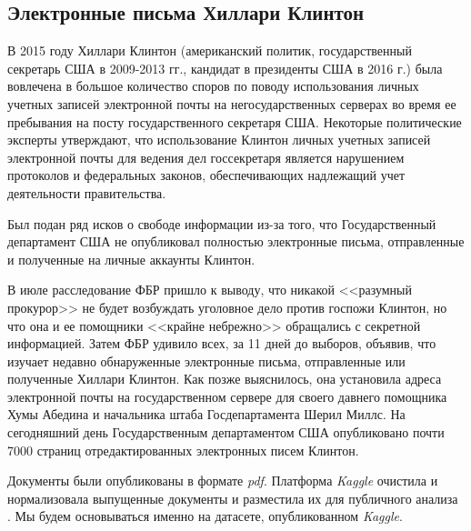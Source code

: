 \subsection{Электронные письма Хиллари Клинтон}

В 2015 году Хиллари Клинтон (американский политик, государственный секретарь США в 2009-2013 гг., кандидат в президенты США в 2016 г.) была вовлечена в большое количество споров по поводу использования личных учетных записей электронной почты на негосударственных серверах во время ее пребывания на посту государственного секретаря США. Некоторые политические эксперты утверждают, что использование Клинтон личных учетных записей электронной почты для ведения дел госсекретаря является нарушением протоколов и федеральных законов, обеспечивающих надлежащий учет деятельности правительства. 



Был подан ряд исков о свободе информации из-за того, что Государственный департамент США не опубликовал полностью электронные письма, отправленные и полученные на личные аккаунты Клинтон.

В июле расследование ФБР пришло к выводу, что никакой <<разумный прокурор>> не будет возбуждать уголовное дело против госпожи Клинтон, но что она и ее помощники <<крайне небрежно>> обращались с секретной информацией. Затем ФБР удивило всех, за 11 дней до выборов, объявив, что изучает недавно обнаруженные электронные письма, отправленные или полученные Хиллари Клинтон. Как позже выяснилось, она установила адреса электронной почты на 
государственном сервере для своего давнего помощника Хумы Абедина и начальника штаба Госдепартамента Шерил Миллс. На сегодняшний день Государственным департаментом США опубликовано почти 7000 страниц отредактированных электронных писем Клинтон. 

Документы были опубликованы в формате \textit{pdf}. Платформа \textit{Kaggle} очистила и нормализовала выпущенные документы и разместила их для публичного анализа \cite{bib1}. Мы будем основываться именно на датасете, опубликованном \textit{Kaggle}.

